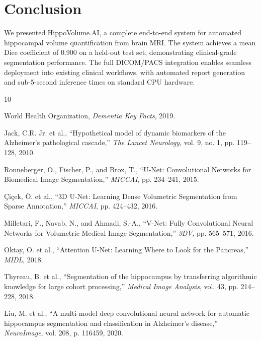 \documentclass[12pt,a4paper,twocolumn]{article}
\begin{document}
\section{Conclusion}

We presented HippoVolume.AI, a complete end-to-end system for automated hippocampal volume quantification from brain MRI. The system achieves a mean Dice coefficient of 0.900 on a held-out test set, demonstrating clinical-grade segmentation performance. The full DICOM/PACS integration enables seamless deployment into existing clinical workflows, with automated report generation and sub-5-second inference times on standard CPU hardware.

\begin{thebibliography}{10}
\small

World Health Organization,
\textit{Dementia Key Facts},
2019.

Jack, C.R. Jr. et al.,
``Hypothetical model of dynamic biomarkers of the Alzheimer's pathological cascade,''
\textit{The Lancet Neurology}, vol. 9, no. 1, pp. 119--128, 2010.

Ronneberger, O., Fischer, P., and Brox, T.,
``U-Net: Convolutional Networks for Biomedical Image Segmentation,''
\textit{MICCAI}, pp. 234--241, 2015.

\c{C}i\c{c}ek, \"{O}. et al.,
``3D U-Net: Learning Dense Volumetric Segmentation from Sparse Annotation,''
\textit{MICCAI}, pp. 424--432, 2016.

Milletari, F., Navab, N., and Ahmadi, S.-A.,
``V-Net: Fully Convolutional Neural Networks for Volumetric Medical Image Segmentation,''
\textit{3DV}, pp. 565--571, 2016.

Oktay, O. et al.,
``Attention U-Net: Learning Where to Look for the Pancreas,''
\textit{MIDL}, 2018.

Thyreau, B. et al.,
``Segmentation of the hippocampus by transferring algorithmic knowledge for large cohort processing,''
\textit{Medical Image Analysis}, vol. 43, pp. 214--228, 2018.

Liu, M. et al.,
``A multi-model deep convolutional neural network for automatic hippocampus segmentation and classification in Alzheimer's disease,''
\textit{NeuroImage}, vol. 208, p. 116459, 2020.

\end{thebibliography}
\end{document}
